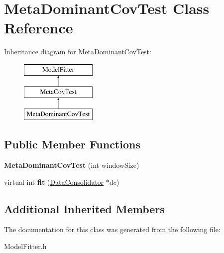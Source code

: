 \hypertarget{classMetaDominantCovTest}{\section{Meta\-Dominant\-Cov\-Test Class Reference}
\label{classMetaDominantCovTest}
}
Inheritance diagram for Meta\-Dominant\-Cov\-Test\-:\begin{figure}[H]
\begin{center}
\leavevmode
\includegraphics[height=3.000000cm]{classMetaDominantCovTest}
\end{center}
\end{figure}
\subsection*{Public Member Functions}
\begin{DoxyCompactItemize}
\item 
\hypertarget{classMetaDominantCovTest_a1aa23cc690a8c8d4afac3eedf96feab7}{{\bfseries Meta\-Dominant\-Cov\-Test} (int window\-Size)}\label{classMetaDominantCovTest_a1aa23cc690a8c8d4afac3eedf96feab7}

\item 
\hypertarget{classMetaDominantCovTest_aaf8b4091a56092f5721f4cdc5f62332f}{virtual int {\bfseries fit} (\hyperlink{classDataConsolidator}{Data\-Consolidator} $\ast$dc)}\label{classMetaDominantCovTest_aaf8b4091a56092f5721f4cdc5f62332f}

\end{DoxyCompactItemize}
\subsection*{Additional Inherited Members}


The documentation for this class was generated from the following file\-:\begin{DoxyCompactItemize}
\item 
Model\-Fitter.\-h\end{DoxyCompactItemize}
